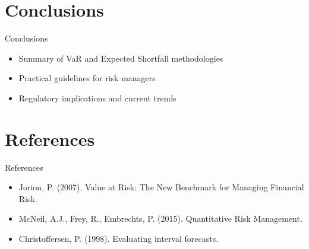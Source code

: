 \documentclass[9pt, aspectratio=169, t]{beamer}
\theoremstyle{definition}
\begin{document}
\section{Conclusions}

\begin{frame}{Conclusions}
    \begin{itemize}
        \item Summary of VaR and Expected Shortfall methodologies
        \item Practical guidelines for risk managers
        \item Regulatory implications and current trends
    \end{itemize}
\end{frame}

\section{References}

\begin{frame}{References}
    \begin{itemize}
        \item Jorion, P. (2007). Value at Risk: The New Benchmark for Managing Financial Risk.
        \item McNeil, A.J., Frey, R., Embrechts, P. (2015). Quantitative Risk Management.
        \item Christoffersen, P. (1998). Evaluating interval forecasts.
    \end{itemize}
\end{frame}
\end{document}
